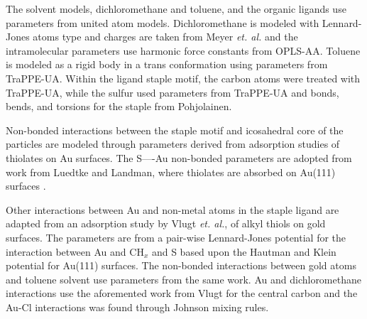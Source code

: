 The solvent models, dichloromethane and toluene, and the organic ligands use parameters from united atom models.
Dichloromethane is modeled with Lennard-Jones atoms type and charges are taken from Meyer \textit{et. al.}\cite{Meyer1978} and the intramolecular parameters use harmonic force constants from OPLS-AA.\cite{Jorgensen98a}
Toluene is modeled as a rigid body in a trans conformation using parameters from TraPPE-UA.\cite{TraPPE-UA.alkylbenzenes} %
Within the ligand staple motif, the carbon atoms were treated with TraPPE-UA,\cite{TraPPE-UA.alkanes,TraPPE-UA.alkylbenzenes,TraPPE-UA.thiols} while the sulfur used parameters from TraPPE-UA\cite{TraPPE-UA.thiols} and bonds, bends, and torsions for the staple from Pohjolainen.\cite{Pohjolainen2016}

Non-bonded interactions between the staple motif and icosahedral core of the particles are modeled through parameters derived from adsorption studies of thiolates on Au surfaces.
The S—-Au non-bonded parameters are adopted from work from Luedtke and Landman,\cite{landman:1998} where thiolates are absorbed on Au(111) surfaces .

Other interactions between Au and non-metal atoms in the staple ligand are adapted from an adsorption study by Vlugt \textit{et. al.},\cite{vlugt:cpc2007154} of alkyl thiols on gold surfaces. The parameters are from a pair-wise Lennard-Jones potential for the interaction between Au and $\mathrm{CH}_x$ and S based upon the Hautman and Klein potential for Au(111) surfaces.\cite{hautman:4994}
The non-bonded interactions between gold atoms and toluene solvent use parameters from the same work.
Au and dichloromethane interactions use the aforemented work from Vlugt for the central carbon and the Au-Cl interactions was found through Johnson mixing rules.\cite{Johnson89}


